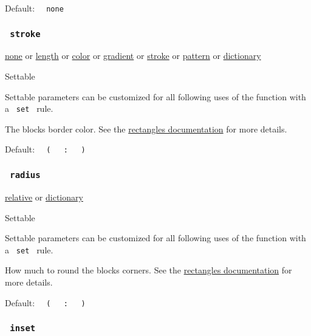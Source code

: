 Default: \texttt{\ }{\texttt{\ none\ }}\texttt{\ }

\subsubsection{\texorpdfstring{\texttt{\ stroke\ }}{ stroke }}\label{parameters-stroke}

\href{/docs/reference/foundations/none/}{none} {or}
\href{/docs/reference/layout/length/}{length} {or}
\href{/docs/reference/visualize/color/}{color} {or}
\href{/docs/reference/visualize/gradient/}{gradient} {or}
\href{/docs/reference/visualize/stroke/}{stroke} {or}
\href{/docs/reference/visualize/pattern/}{pattern} {or}
\href{/docs/reference/foundations/dictionary/}{dictionary}

{{ Settable }}

\label{parameters-stroke-settable-tooltip}
Settable parameters can be customized for all following uses of the
function with a \texttt{\ set\ } rule.

The block\textquotesingle s border color. See the
\href{/docs/reference/visualize/rect/\#parameters-stroke}{rectangle\textquotesingle s
documentation} for more details.

Default:
\texttt{\ }{\texttt{\ (\ }}\texttt{\ }{\texttt{\ :\ }}\texttt{\ }{\texttt{\ )\ }}\texttt{\ }

\subsubsection{\texorpdfstring{\texttt{\ radius\ }}{ radius }}\label{parameters-radius}

\href{/docs/reference/layout/relative/}{relative} {or}
\href{/docs/reference/foundations/dictionary/}{dictionary}

{{ Settable }}

\label{parameters-radius-settable-tooltip}
Settable parameters can be customized for all following uses of the
function with a \texttt{\ set\ } rule.

How much to round the block\textquotesingle s corners. See the
\href{/docs/reference/visualize/rect/\#parameters-radius}{rectangle\textquotesingle s
documentation} for more details.

Default:
\texttt{\ }{\texttt{\ (\ }}\texttt{\ }{\texttt{\ :\ }}\texttt{\ }{\texttt{\ )\ }}\texttt{\ }

\subsubsection{\texorpdfstring{\texttt{\ inset\ }}{ inset }}\label{parameters-inset}

